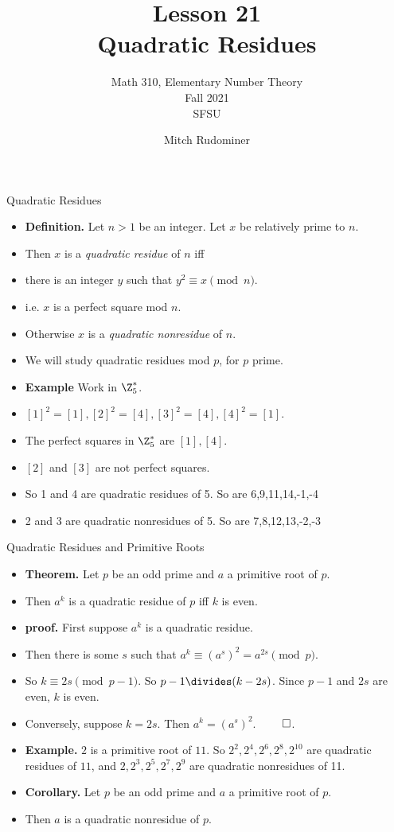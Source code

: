 \documentclass{beamer}
\title{Lesson 21 \\ Quadratic Residues}
\subtitle{Math 310, Elementary Number Theory \\ Fall 2021 \\ SFSU}
\author{Mitch Rudominer}
\date{}
\begin{document}
\begin{frame}
  \titlepage
\end{frame}

\begin{frame}{Quadratic Residues}

\begin{itemize}
  \item \textbf{Definition.} Let $n>1$ be an integer. Let $x$ be relatively prime to $n$.
  \item Then $x$ is a \emph{quadratic residue} of $n$ iff
  \item there is an integer $y$ such that $y^2 \equiv x \pmod n$.
  \item i.e. $x$ is a perfect square mod $n$.
  \item Otherwise $x$ is a \emph{quadratic nonresidue} of $n$.
  \item We will study quadratic residues mod $p$, for $p$ prime.
  \item \textbf{Example} Work in $\Z^*_5$.
  \item $[1]^2 = [1], [2]^2 = [4], [3]^2 = [4], [4]^2 = [1]$.
  \item The perfect squares in $\Z^*_5$ are $[1], [4]$.
  \item $[2]$ and $[3]$ are not perfect squares.
  \item So 1 and 4 are quadratic residues of 5. So are 6,9,11,14,-1,-4
  \item 2 and 3 are quadratic nonresidues of 5. So are 7,8,12,13,-2,-3
\end{itemize}

\end{frame}

\begin{frame}{Quadratic Residues and Primitive Roots}

\begin{itemize}
  \item \textbf{Theorem.} Let $p$ be an odd prime and $a$ a primitive root of $p$.
  \item Then $a^k$ is a quadratic residue of $p$ iff $k$ is even.
  \item \textbf{proof.} First suppose $a^k$ is a quadratic residue.
  \item Then there is some $s$ such that $a^k \equiv (a^s)^2 = a^{2s} \pmod p$.
  \item So $k\equiv 2s \pmod {p-1}$. So $p-1 \divides (k-2s)$. Since $p-1$ and $2s$ are even, $k$ is even.
  \item Conversely, suppose $k=2s$. Then $a^k = (a^s)^2$. $\qed$.
  \item \textbf{Example.} $2$ is a primitive root of $11$. So $2^2, 2^4, 2^6, 2^8, 2^{10}$ are quadratic
  residues of $11$, and $2, 2^3, 2^5, 2^7, 2^9$ are quadratic nonresidues of 11.
  \item \textbf{Corollary.} Let $p$ be an odd prime and $a$ a primitive root of $p$.
  \item Then $a$ is a quadratic nonresidue of $p$.
\end{itemize}

\end{frame}
\end{document}
